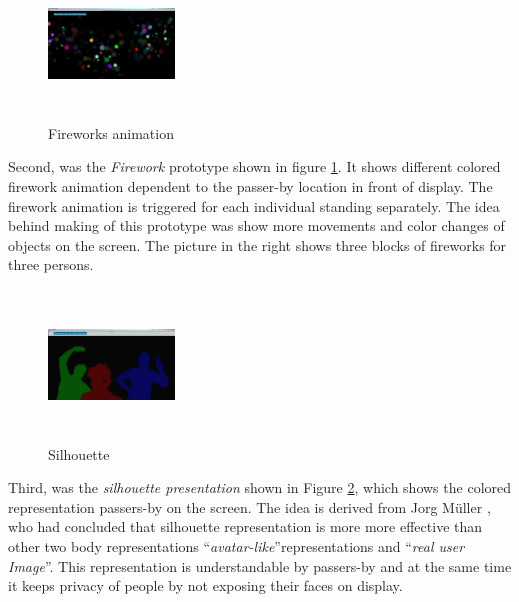 \begin{figure}
  \vspace{-30pt}
  \begin{center}
    \includegraphics[width=0.3\textwidth,height=40mm]{Figures/3/fireworks}
  \end{center}
  \vspace{-20pt}
  \caption{Fireworks animation}          
  \label{fig:Attraction_firework}
  \vspace{-20pt}
\end{figure} 
Second, was the \emph{Firework} prototype shown in figure \ref{fig:Attraction_firework}.  It shows different colored firework animation dependent to the passer-by location in front of display. The firework animation is triggered for each individual standing separately. The idea behind making of this prototype was show more movements and color changes of objects on the screen. The picture in the right shows three blocks of fireworks for three persons.
\break
\break


\begin{figure}
  \vspace{-30pt}
  \begin{center}
    \includegraphics[width=0.3\textwidth,height=40mm]{Figures/3/silhouttee}
  \end{center}
  \vspace{-20pt}
  \caption{Silhouette}          
  \label{fig:Attraction_silhouette}
  \vspace{-20pt}
\end{figure} 
Third, was the \emph{silhouette presentation} shown in Figure \ref{fig:Attraction_silhouette}, which shows the colored representation passers-by on the screen. The idea is derived from Jorg Müller \cite{LookingGlass}, who had concluded that silhouette representation is more more effective than other two body representations  ``\emph{avatar-like}''representations and ``\emph{real user Image}''. This representation is understandable by passers-by  and at the same time it keeps privacy of people by not exposing their faces on display. 
\break
\break




